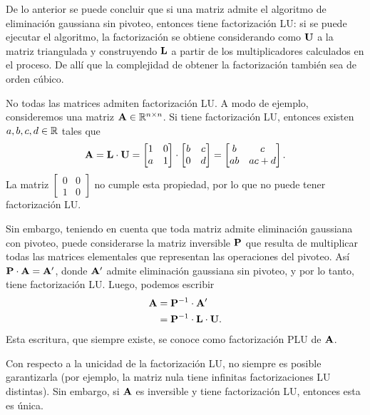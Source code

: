 De lo anterior se puede concluir que si una matriz admite el algoritmo de
eliminación gaussiana sin pivoteo, entonces tiene factorización LU:
si se puede ejecutar el algoritmo,
la factorización se obtiene considerando como $\mathbf{U}$ a la matriz
triangulada y construyendo $\mathbf{L}$ a partir de los multiplicadores
calculados en el proceso. De allí que la complejidad de obtener la
factorización también sea de orden cúbico.


No todas las matrices admiten factorización LU. A modo de ejemplo,
consideremos una matriz $\mathbf{A} \in \mathbb{R}^{n \times n}$. Si tiene
factorización LU, entonces existen $a, b, c, d \in \mathbb{R}$ tales que
\[ \mathbf{A} = \mathbf{L} \cdot \mathbf{U} = \begin{bmatrix}
        1 & 0 \\
        a & 1
    \end{bmatrix} \cdot \begin{bmatrix}
        b & c \\
        0 & d
    \end{bmatrix} = \begin{bmatrix}
        b  & c    \\
        ab & ac+d
    \end{bmatrix}. \]
La matriz $\begin{bmatrix} 0 & 0 \\ 1 & 0 \end{bmatrix}$ no cumple esta
propiedad, por lo que no puede tener factorización LU.

Sin embargo, teniendo en cuenta que toda matriz admite eliminación gaussiana
con pivoteo, puede considerarse la matriz inversible $\mathbf{P}$ que resulta de
multiplicar todas las matrices elementales que representan las operaciones
del pivoteo.
Así $\mathbf{P} \cdot \mathbf{A} = \mathbf{A'}$, donde $\mathbf{A'}$ admite eliminación
gaussiana sin pivoteo, y por lo tanto, tiene factorización LU.
Luego, podemos escribir
\[ \begin{aligned}
    \mathbf{A}
    &= \mathbf{P}^{-1} \cdot \mathbf{A'} \\
    &= \mathbf{P}^{-1} \cdot \mathbf{L} \cdot \mathbf{U}.
\end{aligned} \]
Esta escritura, que siempre existe, se conoce como factorización PLU
de $\mathbf{A}$.

Con respecto a la unicidad de la factorización LU, no siempre es posible
garantizarla (por ejemplo, la matriz nula tiene infinitas factorizaciones
LU distintas). Sin embargo, si $\mathbf{A}$ es inversible y tiene factorización
LU, entonces esta es única. %

